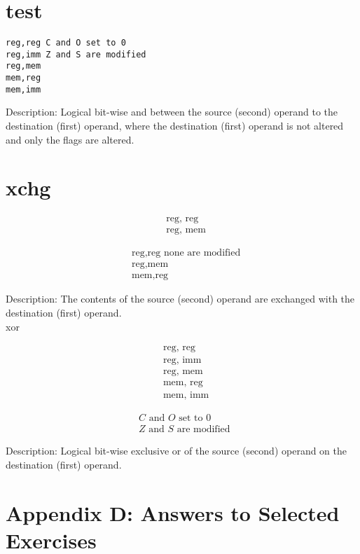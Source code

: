 \documentclass[10pt]{article}
\begin{document}
\section*{test}
\begin{verbatim}
reg,reg C and O set to 0
reg,imm Z and S are modified
reg,mem
mem,reg
mem,imm
\end{verbatim}

Description: Logical bit-wise and between the source (second) operand to the destination (first) operand, where the destination (first) operand is not altered and only the flags are altered.

\section*{xchg}
$$
\begin{aligned}
& \text { reg, reg } \\
& \text { reg, mem }
\end{aligned}
$$

$$
\begin{aligned}
& \text { reg,reg none are modified } \\
& \text { reg,mem } \\
& \text { mem,reg }
\end{aligned}
$$

Description: The contents of the source (second) operand are exchanged with the destination (first) operand.\\
xor

$$
\begin{aligned}
& \text { reg, reg } \\
& \text { reg, imm } \\
& \text { reg, mem } \\
& \text { mem, reg } \\
& \text { mem, imm }
\end{aligned}
$$

$$
\begin{aligned}
& C \text { and } O \text { set to } 0 \\
& Z \text { and } S \text { are modified }
\end{aligned}
$$

Description: Logical bit-wise exclusive or of the source (second) operand on the destination (first) operand.

\section*{Appendix D: Answers to Selected Exercises}
\end{document}
